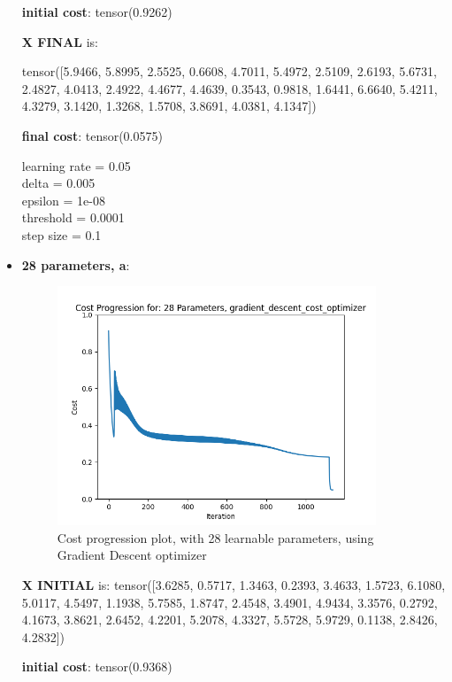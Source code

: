 \documentclass[inscr,ack,preface]{diphdthesis}
\begin{document}
\begin{itemize}
\textbf{initial cost}: tensor(0.9262)

\textbf{X FINAL} is:

 tensor([5.9466, 5.8995, 2.5525, 0.6608, 4.7011, 5.4972, 2.5109, 2.6193, 5.6731,
        2.4827, 4.0413, 2.4922, 4.4677, 4.4639, 0.3543, 0.9818, 1.6441, 6.6640,
        5.4211, 4.3279, 3.1420, 1.3268, 1.5708, 3.8691, 4.0381, 4.1347])

\textbf{final cost}: tensor(0.0575)

learning rate =  0.05 \\
delta =  0.005 \\
epsilon =  1e-08 \\
threshold =  0.0001\\ 
step size =  0.1 \\

\item \textbf{28 parameters,  a}: 

\begin{figure}[h]
\begin{center}
    \includegraphics[width=0.9\textwidth]{28.png}
    \caption{Cost progression plot, with 28 learnable parameters, using Gradient Descent optimizer} 
    \label{fig:enter-label}
    \end{center}
\end{figure}

\textbf{X INITIAL} is:
 tensor([3.6285, 0.5717, 1.3463, 0.2393, 3.4633, 1.5723, 6.1080, 5.0117, 4.5497,
        1.1938, 5.7585, 1.8747, 2.4548, 3.4901, 4.9434, 3.3576, 0.2792, 4.1673,
        3.8621, 2.6452, 4.2201, 5.2078, 4.3327, 5.5728, 5.9729, 0.1138, 2.8426,
        4.2832])
        
\textbf{initial cost}: tensor(0.9368)


\end{itemize}
\end{document}
